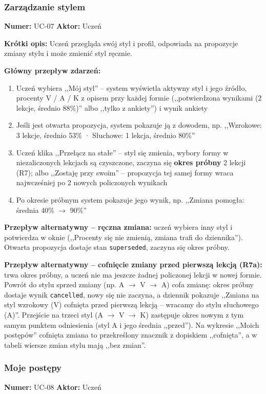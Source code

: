 \subsubsection{Zarządzanie stylem}
\textbf{Numer:} UC-07 \quad \textbf{Aktor:} Uczeń

\textbf{Krótki opis:} Uczeń przegląda swój styl i profil, odpowiada na propozycje zmiany stylu i może zmienić styl ręcznie.

\textbf{Główny przepływ zdarzeń:}
\begin{enumerate}[leftmargin=*]
    \item Uczeń wybiera ,,Mój styl'' -- system wyświetla aktywny styl i jego źródło, procenty V / A / K z opisem przy każdej formie (,,potwierdzona wynikami (2 lekcje, średnio 88\%)'' albo ,,tylko z ankiety'') i wynik ankiety
    \item Jeśli jest otwarta propozycja, system pokazuje ją z dowodem, np. ,,Wzrokowe: 3 lekcje, średnio 53\% · Słuchowe: 1 lekcja, średnio 80\%''
    \item Uczeń klika ,,Przełącz na stałe'' -- styl się zmienia, wybory formy w niezaliczonych lekcjach są czyszczone, zaczyna się \textbf{okres próbny} 2 lekcji (R7); albo ,,Zostaję przy swoim'' -- propozycja tej samej formy wraca najwcześniej po 2 nowych policzonych wynikach
    \item Po okresie próbnym system pokazuje jego wynik, np. ,,Zmiana pomogła: średnia 40\% $\to$ 90\%''
\end{enumerate}

\textbf{Przepływ alternatywny -- ręczna zmiana:} uczeń wybiera inny styl i potwierdza w oknie (,,Procenty się nie zmienią, zmiana trafi do dziennika''). Otwarta propozycja dostaje stan \texttt{superseded}, zaczyna się okres próbny.

\textbf{Przepływ alternatywny -- cofnięcie zmiany przed pierwszą lekcją (R7a):} trwa okres próbny, a uczeń nie ma jeszcze żadnej policzonej lekcji w nowej formie. Powrót do stylu sprzed zmiany (np. A $\to$ V $\to$ A) cofa zmianę: okres próbny dostaje wynik \texttt{cancelled}, nowy się nie zaczyna, a dziennik pokazuje ,,Zmiana na styl wzrokowy (V) cofnięta przed pierwszą lekcją -- wracamy do stylu słuchowego (A)''. Przejście na trzeci styl (A $\to$ V $\to$ K) zastępuje okres nowym z tym samym punktem odniesienia (styl A i jego średnia ,,przed''). Na wykresie ,,Moich postępów'' cofnięta zmiana to przekreślony znacznik z dopiskiem ,,cofnięta'', a w tabeli wiersze zmian stylu mają ,,bez zmian''.

\subsubsection{Moje postępy}
\textbf{Numer:} UC-08 \quad \textbf{Aktor:} Uczeń

